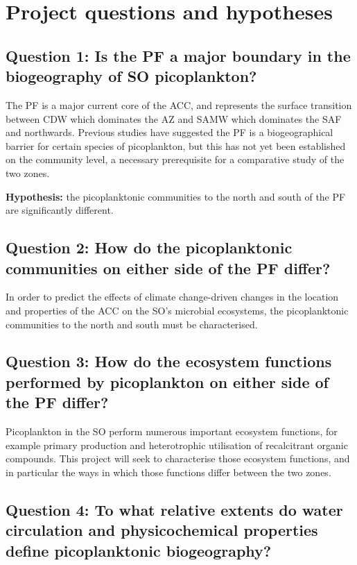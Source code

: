 \section{Project questions and hypotheses}

\subsection{Question 1: Is the \ac{PF} a major boundary in the biogeography of \ac{SO} picoplankton?}

The \ac{PF} is a major current core of the \ac{ACC}, and represents the surface transition between \ac{CDW} which dominates the \ac{AZ} and \ac{SAMW} which dominates the \ac{SAF} and northwards.
Previous studies \citep[e.g.][]{Abell:2005ji,Giebel:2009hr,Selje:2004ka} have suggested the \ac{PF} is a biogeographical barrier for certain species of picoplankton, but this has not yet been established on the community level, a necessary prerequisite for a comparative study of the two zones.

\textbf{Hypothesis:} the picoplanktonic communities to the north and south of the \ac{PF} are significantly different.

\subsection{Question 2: How do the picoplanktonic communities on either side of the \ac{PF} differ?}

In order to predict the effects of climate change-driven changes in the location and properties of the \ac{ACC} on the \ac{SO}'s microbial ecosystems, the picoplanktonic communities to the north and south must be characterised.

\subsection{Question 3: How do the ecosystem functions performed by picoplankton on either side of the \ac{PF} differ?}

Picoplankton in the \ac{SO} perform numerous important ecosystem functions, for example primary production and heterotrophic utilisation of recalcitrant organic compounds.
This project will seek to characterise those ecosystem functions, and in particular the ways in which those functions differ between the two zones.

\subsection{Question 4: To what relative extents do water circulation and physicochemical properties define picoplanktonic biogeography?}

